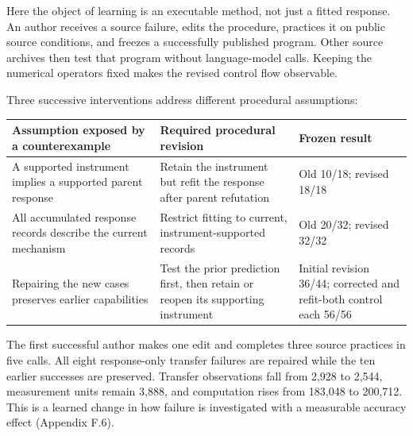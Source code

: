 \documentclass[twoside,11pt]{article}
\begin{document}
Here the object of learning is an executable method, not just a fitted response.
An author receives a source failure, edits the procedure, practices it on public
source conditions, and freezes a successfully published program. Other source
archives then test that program without language-model calls. Keeping the
numerical operators fixed makes the revised control flow observable.


Three successive interventions address different procedural assumptions:


\begingroup\small\setlength{\tabcolsep}{4pt}
\renewcommand{\arraystretch}{1.18}
\par\addvspace{.7em}\noindent\begin{minipage}{\linewidth}
\begin{tabular}{@{}>{\raggedright\arraybackslash}p{}>{\raggedright\arraybackslash}p{}>{\raggedright\arraybackslash}p{}@{}}
\toprule
\textbf{Assumption exposed by a counterexample} & \textbf{Required procedural revision} & \textbf{Frozen result} \\
\midrule
A supported instrument implies a supported parent response & Retain the instrument but refit the response after parent refutation & Old 10/18; revised 18/18 \\
All accumulated response records describe the current mechanism & Restrict fitting to current, instrument-supported records & Old 20/32; revised 32/32 \\
Repairing the new cases preserves earlier capabilities & Test the prior prediction first, then retain or reopen its supporting instrument & Initial revision 36/44; corrected and refit-both control each 56/56 \\
\bottomrule
\end{tabular}
\end{minipage}\par\addvspace{.7em}
\endgroup

The first successful author makes one edit and completes three source practices
in five calls. All eight response-only transfer failures are repaired while the
ten earlier successes are preserved. Transfer observations fall from 2,928 to
2,544, measurement units remain 3,888, and computation rises from 183,048 to
200,712. This is a learned change in how failure is investigated with a measurable
accuracy effect (Appendix F.6).
\end{document}

